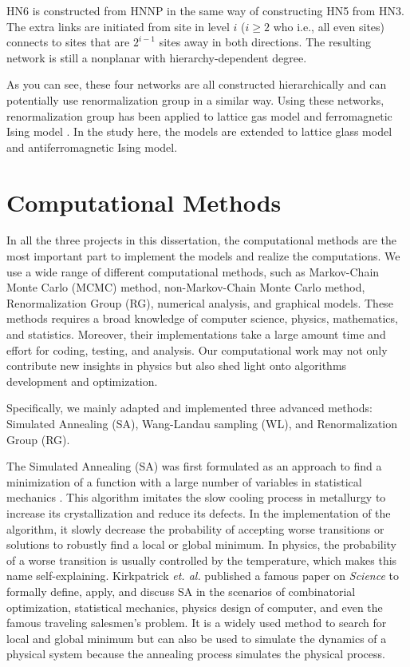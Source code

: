 HN6 \cite{Boettcher09c} is constructed from HNNP in the same way of constructing HN5 from HN3. The extra links are initiated from site in level $i$ ($i\ge2$ who
i.e., all even sites)  connects to sites that are $2^{i-1}$
sites away in both directions. The resulting network is still a nonplanar with hierarchy-dependent degree.

As you can see, these four networks are all constructed hierarchically and can potentially use renormalization group in a similar way. Using these networks, renormalization group has been applied to lattice gas model \cite{cheng2015jamming, BoHa11} and ferromagnetic Ising model \cite{Boettcher2011HNNP, boettcher2015classification}. In the study here, the models are extended to lattice glass model and antiferromagnetic Ising model. 




\section{Computational Methods}
In all the three projects in this dissertation, the computational methods are the most important part to implement the models and realize the computations. We use a wide range of different computational methods, such as Markov-Chain Monte Carlo (MCMC) method, non-Markov-Chain Monte Carlo method, Renormalization Group (RG), numerical analysis, and graphical models. These methods requires a broad knowledge of computer science, physics, mathematics, and statistics. Moreover, their implementations take a large amount time and effort for coding, testing, and analysis. Our computational work may not only contribute new insights in physics but also shed light onto algorithms development and optimization.

Specifically, we mainly adapted and implemented three advanced methods: Simulated Annealing (SA), Wang-Landau sampling (WL), and Renormalization Group (RG). 

The Simulated Annealing (SA) was first formulated as an approach to find a minimization of a function with a large number of variables in statistical mechanics \cite{khachaturyan1979statistical, khachaturyan1981thermodynamic}. This algorithm imitates the slow cooling process in metallurgy to increase its crystallization and reduce its defects. In the implementation of the algorithm, it slowly decrease the probability of accepting worse transitions or solutions to robustly find a local or global minimum. In physics, the probability of a worse transition is usually controlled by the temperature, which makes this name self-explaining. Kirkpatrick {\it et. al.} \cite{SA} published a famous paper on {\it Science} to formally define, apply, and discuss SA  in the scenarios of combinatorial optimization, statistical mechanics, physics design of computer, and even the famous traveling salesmen's problem. It is a widely used method to search for local and global minimum but can also be used to simulate the dynamics of a physical system because the annealing process simulates the physical process.

